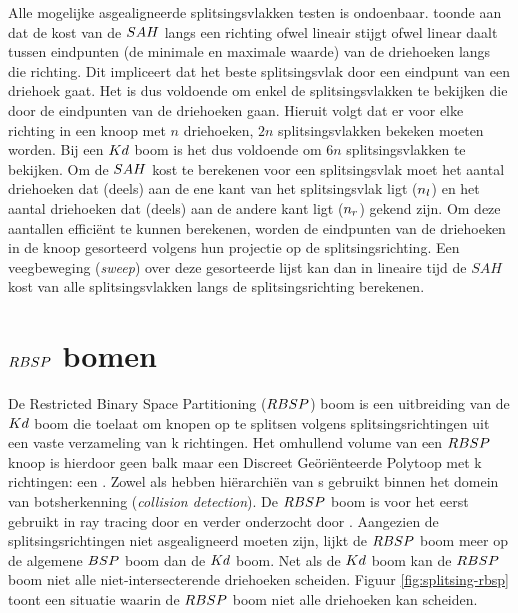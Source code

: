     Alle mogelijke asgealigneerde splitsingsvlakken testen is ondoenbaar. 
    \authorHavran{} \cite{havran2000heuristic} toonde aan dat de kost van de $SAH$ langs een richting ofwel lineair stijgt ofwel linear daalt tussen eindpunten (de minimale en maximale waarde) van de driehoeken langs die richting.
    Dit impliceert dat het beste splitsingsvlak door een eindpunt van een driehoek gaat.
    Het is dus voldoende om enkel de splitsingsvlakken te bekijken die door de eindpunten van de driehoeken gaan.
    Hieruit volgt dat er voor elke richting in een knoop met $n$ driehoeken, $2n$ splitsingsvlakken bekeken moeten worden.
    Bij een $Kd$ boom is het dus voldoende om $6n$ splitsingsvlakken te bekijken.
    Om de $SAH$ kost te berekenen voor een splitsingsvlak moet het aantal driehoeken dat (deels) aan de ene kant van het splitsingsvlak ligt ($n_l$) en het aantal driehoeken dat (deels) aan de andere kant ligt ($n_r$) gekend zijn.
    Om deze aantallen efficiënt te kunnen berekenen, worden de eindpunten van de driehoeken in de knoop gesorteerd volgens hun projectie op de splitsingsrichting.
    Een veegbeweging (\textit{sweep}) over deze gesorteerde lijst kan dan in lineaire tijd de $SAH$ kost van alle splitsingsvlakken langs de splitsingsrichting berekenen.

\section{$RBSP$ bomen}
    De Restricted Binary Space Partitioning ($RBSP$) boom is een uitbreiding van de $Kd$ boom die toelaat om knopen op te splitsen volgens splitsingsrichtingen uit een vaste verzameling van k richtingen.
    Het omhullend volume van een $RBSP$ knoop is hierdoor geen balk maar een Discreet Geöriënteerde Polytoop met k richtingen: een \symKDOP.
    Zowel \authorKlosowki{} \cite{klosowski1998efficient} als \authorZachmann{} \cite{zachmann1998rapid} hebben hiërarchiën van \symKDOP s gebruikt binnen het domein van botsherkenning (\textit{collision detection}).
    De $RBSP$ boom is voor het eerst gebruikt in ray tracing door \authorKammaje{} \cite{Kammaje} en verder onderzocht door \authorBudge{} \cite{Budge}.
    Aangezien de splitsingsrichtingen niet asgealigneerd moeten zijn, lijkt de $RBSP$ boom meer op de algemene $BSP$ boom dan de $Kd$ boom. Net als de $Kd$ boom kan de $RBSP$ boom niet alle niet-intersecterende driehoeken scheiden. 
    Figuur \ref{fig:splitsing-rbsp} toont een situatie waarin de $RBSP$ boom niet alle driehoeken kan scheiden.
    \\

